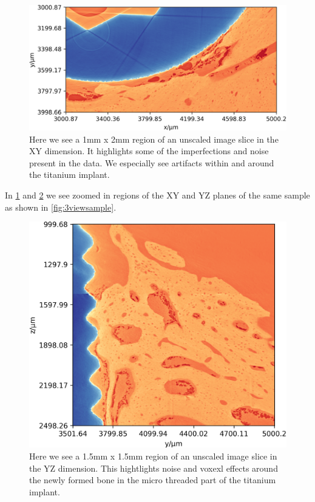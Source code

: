 \begin{figure}
\centering
\includegraphics[width=\textwidth]{figures/770c_pag-bic-xy-1x.png}
\caption{Here we see a 1mm x 2mm region of an unscaled image slice in the XY dimension. It highlights
some of the imperfections and noise present in the data. We especially see artifacts within and
around the titanium implant. }
\label{fig:xy-slice}
\end{figure}

In \cref{fig:xy-slice} and \cref{fig:yz-slice} we see zoomed in regions of the XY and YZ planes
of the same sample as shown in \cref{fig:3viewsample}.

\begin{figure}
\centering
\includegraphics[width=\columnwidth]{figures/770c_pag-bic-yz-1x.png}
\caption{Here we see a 1.5mm x 1.5mm region of an unscaled image slice in the YZ dimension. This
hightlights noise and voxexl effects around the newly formed bone in the micro threaded part of
the titanium implant.}
\label{fig:yz-slice}
\end{figure}

